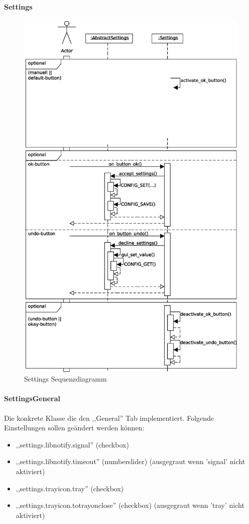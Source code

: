 \paragraph{Settings}
\begin{figure}[htb!]
	\centering
        \includegraphics[scale=0.52]{st_settings2.eps}
	\caption{Settings Sequenzdiagramm}
	\label{st_seq_settings}
\end{figure}


\paragraph{SettingsGeneral}
Die konkrete Klasse die den ,,General'' Tab implementiert.
Folgende Einstellungen sollen geändert werden können:
\begin{itemize}
\item ,,settings.libnotify.signal'' (checkbox)
\item ,,settings.libnotify.timeout'' (numberslider) (ausgegraut wenn 'signal' nicht aktiviert)
\item ,,settings.trayicon.tray'' (checkbox)
\item ,,settings.trayicon.totrayonclose'' (checkbox) (ausgegraut wenn 'tray' nicht aktiviert)
\end{itemize}

